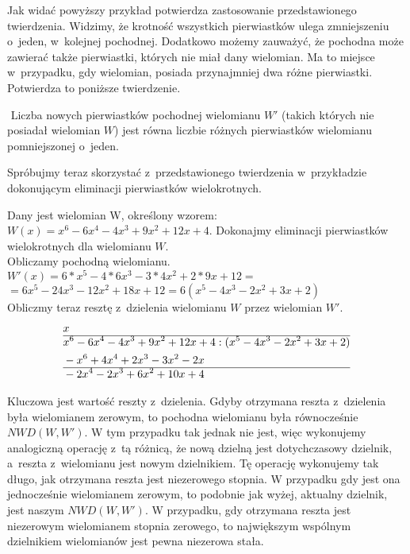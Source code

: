 Jak widać powyższy przykład potwierdza zastosowanie przedstawionego twierdzenia. Widzimy, że krotność wszystkich pierwiastków ulega zmniejszeniu o~jeden, w~kolejnej pochodnej. Dodatkowo możemy zauważyć, że pochodna może zawierać także pierwiastki, których nie miał dany wielomian. Ma to miejsce w~przypadku, gdy wielomian, posiada przynajmniej dwa różne pierwiastki. Potwierdza to poniższe twierdzenie.

\begin{theorem}
	$ $
	Liczba nowych pierwiastków pochodnej wielomianu $W'$ (takich których nie posiadał wielomian $W$) jest równa liczbie różnych pierwiastków wielomianu pomniejszonej o~jeden.
\end{theorem}

Spróbujmy teraz skorzystać z~przedstawionego twierdzenia w~przykładzie dokonującym eliminacji pierwiastków wielokrotnych.

\begin{example}
	$ $ \\
	Dany jest wielomian W, określony wzorem: $W(x)=x^6-6x^4-4x^3+9x^2+12x+4$. Dokonajmy eliminacji pierwiastków wielokrotnych dla wielomianu $W$. \\
	Obliczamy pochodną wielomianu. \\
	$W'(x)=6*x^5-4*6x^3-3*4x^2+2*9x+12=$ \\
	$=6x^5-24x^3-12x^2+18x+12=6(x^5-4x^3-2x^2+3x+2)$ \\
	Obliczmy teraz resztę z~dzielenia wielomianu $W$ przez wielomian $W'$.
	\begin{equation*}
	\begin{split}
		&x\\\hline
		&x^6-6x^4-4x^3+9x^2+12x+4 : (x^5-4x^3-2x^2+3x+2) \\
		&-x^6+4x^4+2x^3-3x^2-2x \\\hline
		&-2x^4-2x^3+6x^2+10x+4
	\end{split}
	\end{equation*}
	
	Kluczowa jest wartość reszty z~dzielenia. Gdyby otrzymana reszta z~dzielenia była wielomianem zerowym, to pochodna wielomianu była równocześnie $NWD(W, W')$. W tym przypadku tak jednak nie jest, więc wykonujemy analogiczną operację z~tą różnicą, że nową dzielną jest dotychczasowy dzielnik, a~reszta z~wielomianu jest nowym dzielnikiem. Tę operację wykonujemy tak długo, jak otrzymana reszta jest niezerowego stopnia. W przypadku gdy jest ona jednocześnie wielomianem zerowym, to podobnie jak wyżej, aktualny dzielnik, jest naszym $NWD(W, W')$. W przypadku, gdy otrzymana reszta jest niezerowym wielomianem stopnia zerowego, to największym wspólnym dzielnikiem wielomianów jest pewna niezerowa stała.
\end{example}


